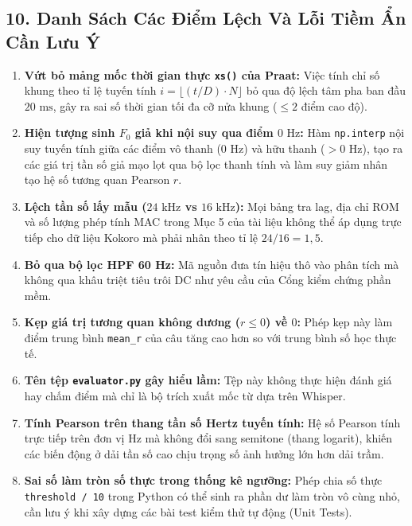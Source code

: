 \documentclass[11pt,a4paper]{article}
\begin{document}
\subsection*{10. Danh Sách Các Điểm Lệch Và Lỗi Tiềm Ẩn Cần Lưu Ý}

\begin{enumerate}
    \setlength{\itemsep}{2.5pt}
    \item \textbf{Vứt bỏ mảng mốc thời gian thực \texttt{xs()} của Praat:} Việc tính chỉ số khung theo tỉ lệ tuyến tính $i = \lfloor (t/D) \cdot N \rfloor$ bỏ qua độ lệch tâm pha ban đầu $20\text{ ms}$, gây ra sai số thời gian tối đa cỡ nửa khung ($\le 2$ điểm cao độ).
    \item \textbf{Hiện tượng sinh $F_0$ giả khi nội suy qua điểm $0\text{ Hz}$:} Hàm \texttt{np.interp} nội suy tuyến tính giữa các điểm vô thanh ($0\text{ Hz}$) và hữu thanh ($> 0\text{ Hz}$), tạo ra các giá trị tần số giả mạo lọt qua bộ lọc thanh tính và làm suy giảm nhân tạo hệ số tương quan Pearson $r$.
    \item \textbf{Lệch tần số lấy mẫu ($24\text{ kHz}$ vs $16\text{ kHz}$):} Mọi bảng tra lag, địa chỉ ROM và số lượng phép tính MAC trong Mục 5 của tài liệu không thể áp dụng trực tiếp cho dữ liệu Kokoro mà phải nhân theo tỉ lệ $24/16 = 1{,}5$.
    \item \textbf{Bỏ qua bộ lọc HPF 60 Hz:} Mã nguồn đưa tín hiệu thô vào phân tích mà không qua khâu triệt tiêu trôi DC như yêu cầu của Cổng kiểm chứng phần mềm.
    \item \textbf{Kẹp giá trị tương quan không dương ($r \le 0$) về $0$:} Phép kẹp này làm điểm trung bình \texttt{mean\_r} của câu tăng cao hơn so với trung bình số học thực tế.
    \item \textbf{Tên tệp \texttt{evaluator.py} gây hiểu lầm:} Tệp này không thực hiện đánh giá hay chấm điểm mà chỉ là bộ trích xuất mốc từ dựa trên Whisper.
    \item \textbf{Tính Pearson trên thang tần số Hertz tuyến tính:} Hệ số Pearson tính trực tiếp trên đơn vị Hz mà không đổi sang semitone (thang logarit), khiến các biến động ở dải tần số cao chịu trọng số ảnh hưởng lớn hơn dải trầm.
    \item \textbf{Sai số làm tròn số thực trong thống kê ngưỡng:} Phép chia số thực \texttt{threshold / 10} trong Python có thể sinh ra phần dư làm tròn vô cùng nhỏ, cần lưu ý khi xây dựng các bài test kiểm thử tự động (Unit Tests).
\end{enumerate}
\end{document}
